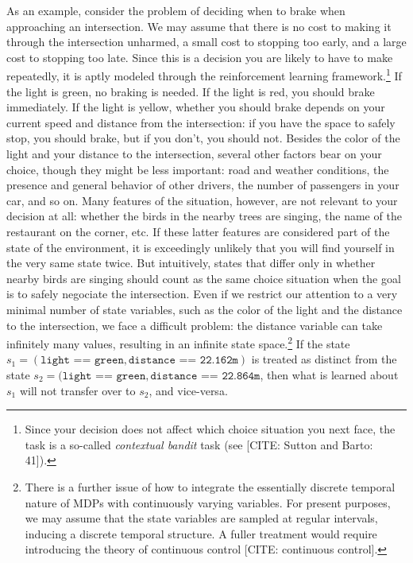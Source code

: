 \documentclass{article}
\begin{document}
As an example, consider the problem of deciding when to brake when approaching an intersection.
We may assume that there is no cost to making it through the intersection unharmed, a small cost to stopping too early, and a large cost to stopping too late.
Since this is a decision you are likely to have to make repeatedly, it is aptly modeled through the reinforcement learning framework.\footnote{Since your decision does not affect which choice situation you next face, the task is a so-called \emph{contextual bandit} task (see [CITE: Sutton and Barto: 41]).}
If the light is green, no braking is needed.
If the light is red, you should brake immediately.
If the light is yellow, whether you should brake depends on your current speed and distance from the intersection: if you have the space to safely stop, you should brake, but if you don't, you should not.
Besides the color of the light and your distance to the intersection, several other factors bear on your choice, though they might be less important: road and weather conditions, the presence and general behavior of other drivers, the number of passengers in your car, and so on.
Many features of the situation, however, are not relevant to your decision at all: whether the birds in the nearby trees are singing, the name of the restaurant on the corner, etc.
If these latter features are considered part of the state of the environment, it is exceedingly unlikely that you will find yourself in the very same state twice.
But intuitively, states that differ only in whether nearby birds are singing should count as the same choice situation when the goal is to safely negociate the intersection.
Even if we restrict our attention to a very minimal number of state variables, such as the color of the light and the distance to the intersection, we face a difficult problem: the distance variable can take infinitely many values, resulting in an infinite state space.\footnote{There is a further issue of how to integrate the essentially discrete temporal nature of MDPs with continuously varying variables.
For present purposes, we may assume that the state variables are sampled at regular intervals, inducing a discrete temporal structure.
A fuller treatment would require introducing the theory of continuous control [CITE: continuous control].}
If the state $s_1 = (\texttt{light == green}, \texttt{distance == 22.162m})$ is treated as distinct from the state $s_2 = (\texttt{light == green}, \texttt{distance == 22.864m}$, then what is learned about $s_1$ will not transfer over to $s_2$, and vice-versa.
\end{document}
